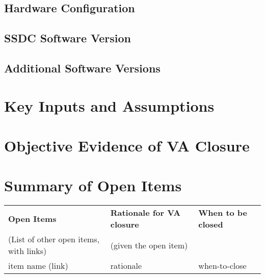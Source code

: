 \documentclass[TR]{spherex}
\begin{document}
\subsection{Hardware Configuration}

\subsection{SSDC Software Version}

\subsection{Additional Software Versions} %

\section{Key Inputs and Assumptions} %


\section{Objective Evidence of VA Closure}

\section{Summary of Open Items}

\begin{longtable}{|l|l|l|}
\textbf{Open Items} & \textbf{Rationale for VA closure} & \textbf{When to be closed} \\
(List of other open items, with links) & (given the open item) & \\
\endhead
item name (link) & rationale & when-to-close \\
\end{longtable}
\end{document}
